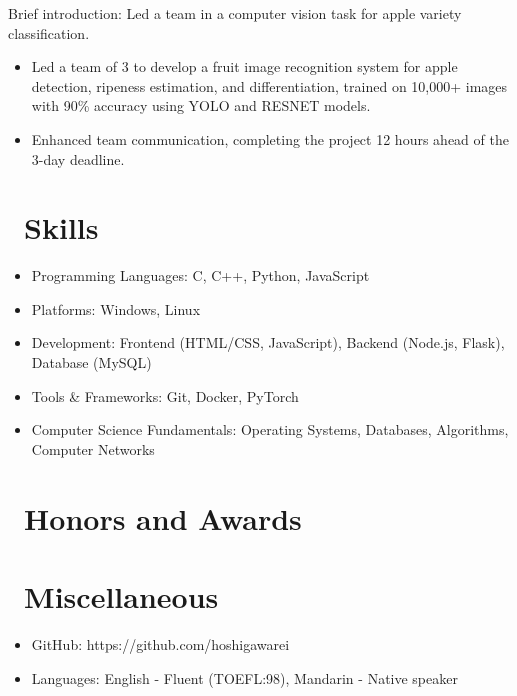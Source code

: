 \documentclass{resume}
\begin{document}
Brief introduction: Led a team in a computer vision task for apple variety classification. 
\begin{itemize}
  \item Led a team of 3 to develop a fruit image recognition system for apple detection, ripeness estimation, and differentiation, trained on 10,000+ images with 90\% accuracy using YOLO and RESNET models.  
  \item Enhanced team communication, completing the project 12 hours ahead of the 3-day deadline.
\end{itemize}


\section{\faCogs\ Skills}
\begin{itemize}[parsep=0.5ex]
  \item Programming Languages: C, C++, Python, JavaScript
  \item Platforms: Windows, Linux
  \item Development: Frontend (HTML/CSS, JavaScript), Backend (Node.js, Flask), Database (MySQL)
  \item Tools \& Frameworks: Git, Docker, PyTorch
  \item Computer Science Fundamentals: Operating Systems, Databases, Algorithms, Computer Networks
\end{itemize}

\section{\faHeartO\ Honors and Awards}

\section{\faInfo\ Miscellaneous}
\begin{itemize}[parsep=0.5ex]
  \item GitHub: https://github.com/hoshigawarei
  \item Languages: English - Fluent (TOEFL:98), Mandarin - Native speaker
\end{itemize}

%
%
\end{document}
